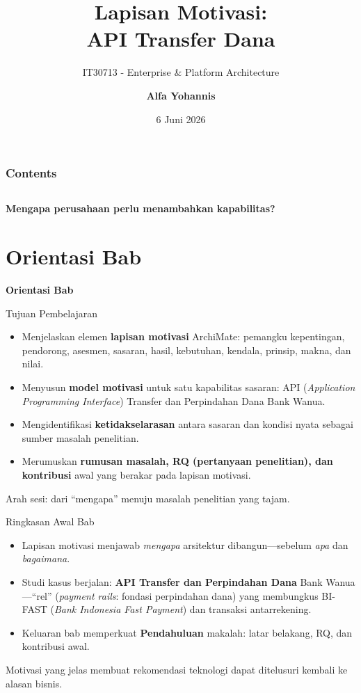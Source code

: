 \documentclass[aspectratio=169, table]{beamer}
\title{\huge Lapisan Motivasi:\\
  \vspace{8pt}
  API Transfer Dana}
\subtitle{IT30713 - Enterprise \& Platform Architecture}
\author{\textbf{Alfa Yohannis}}
\date{6 Juni 2026}
\newcommand{\sectionframe}[1]{%
  \begin{frame}{\hfill}
    \centering
    \Huge{\textbf{#1}}
  \end{frame}
}
\newcommand{\takeaway}[1]{%
  \vspace{4pt}
  {\footnotesize #1}
}
\begin{document}
\frame{\titlepage}

\begin{frame}[fragile]
  \frametitle{Contents}
  \vspace{20pt}
  \begin{columns}[t]
    \tableofcontents[sections={1-4}]

    \tableofcontents[sections={5-8}]
  \end{columns}
\end{frame}

\begin{frame}{\hfill}
  \centering
  \Huge{\textbf{Mengapa perusahaan perlu menambahkan kapabilitas?}}
\end{frame}

\section{Orientasi Bab}
\sectionframe{Orientasi Bab}

\begin{frame}{Tujuan Pembelajaran}
  \vspace{8pt}
  \begin{itemize}
    \item Menjelaskan elemen \textbf{lapisan motivasi} ArchiMate: pemangku
          kepentingan, pendorong, asesmen, sasaran, hasil, kebutuhan, kendala,
          prinsip, makna, dan nilai.
    \item Menyusun \textbf{model motivasi} untuk satu kapabilitas sasaran:
          API (\emph{Application Programming Interface}) Transfer dan Perpindahan Dana Bank Wanua.
    \item Mengidentifikasi \textbf{ketidakselarasan} antara sasaran dan kondisi
          nyata sebagai sumber masalah penelitian.
    \item Merumuskan \textbf{rumusan masalah, RQ (pertanyaan penelitian), dan kontribusi} awal yang
          berakar pada lapisan motivasi.
  \end{itemize}
  \takeaway{Arah sesi: dari ``mengapa'' menuju masalah penelitian yang tajam.}
\end{frame}

\begin{frame}{Ringkasan Awal Bab}
  \vspace{6pt}
  \begin{itemize}
    \item Lapisan motivasi menjawab \emph{mengapa} arsitektur dibangun---sebelum
          \emph{apa} dan \emph{bagaimana}.
    \item Studi kasus berjalan: \textbf{API Transfer dan Perpindahan Dana} Bank
          Wanua---``rel'' (\emph{payment rails}: fondasi perpindahan dana) yang membungkus BI-FAST (\emph{Bank Indonesia Fast Payment}) dan transaksi antarrekening.
    \item Keluaran bab memperkuat \textbf{Pendahuluan} makalah: latar belakang,
          RQ, dan kontribusi awal.
  \end{itemize}
  \takeaway{Motivasi yang jelas membuat rekomendasi teknologi dapat ditelusuri
  kembali ke alasan bisnis.}
\end{frame}
\end{document}
